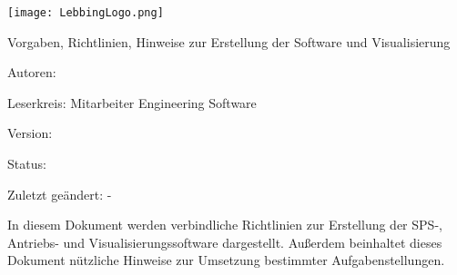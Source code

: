 \begin{titlepage}

    
    \begin{center} 
    \texttt{[image: LebbingLogo.png]}
    \par\vspace{1.5cm}
    {\scshape\Large \company\par}
    \vspace{2cm}
    
    {\Huge\textbf{\titlename}\par}
    \vspace{0.5cm}
    {\Large Vorgaben, Richtlinien, Hinweise zur Erstellung der Software und Visualisierung\par}
    \vspace{1.5cm}
\end{center}
    
        {Autoren:  \authorname\par}
        {Leserkreis:  Mitarbeiter Engineering Software\par}
        {Version:  \version\par}
        {Status:  \state\par}
        {Zuletzt geändert:  \lasteditor-\par}
        { \company\par}
        { \lastchanged\par}        
        \vspace{3cm}
        \noindent In diesem Dokument werden verbindliche Richtlinien zur Erstellung der SPS-, Antriebs- und Visualisierungssoftware dargestellt. Außerdem beinhaltet dieses Dokument nützliche Hinweise zur Umsetzung bestimmter Aufgabenstellungen.
    
    \end{titlepage}